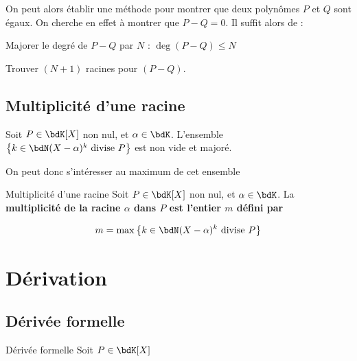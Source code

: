 \documentclass[a4paper,french,bookmarks]{article}
\begin{document}
On peut alors établir une méthode pour montrer que deux polynômes $P$ et $Q$ sont égaux. On cherche en effet à montrer que $P - Q = 0$. Il suffit alors de :

\begin{enumerate}
    \ithand Majorer le degré de $P - Q$ par $N$ : $\deg(P-Q) \leq N$
    
    \ithand Trouver $(N+1)$ racines pour $(P-Q)$.
\end{enumerate}

\subsection{Multiplicité d'une racine}

\begin{property}{}{}
    Soit $P \in \bdK[X]$ non nul, et $\alpha \in \bdK$. L'ensemble $\left\{k \in \bdN  (X -\alpha)^k \ \text{divise} \ P\right\}$ est non vide et majoré.
\end{property}


On peut donc s'intéresser au maximum de cet ensemble 

\begin{definition}{Multiplicité d'une racine}{}
    Soit $P \in \bdK[X]$ non nul, et $\alpha \in \bdK$. La \bf{multiplicité de la racine $\alpha$ dans $P$} est l'entier $m$ défini par 
    
    \[ m = \max \left\{k \in \bdN  (X -\alpha)^k \ \text{divise} \ P\right\}\]
\end{definition}

\section{Dérivation}

\subsection{Dérivée formelle}

\begin{definition}{Dérivée formelle}{}
    Soit $P \in \bdK[X]$
\end{definition}
\end{document}
